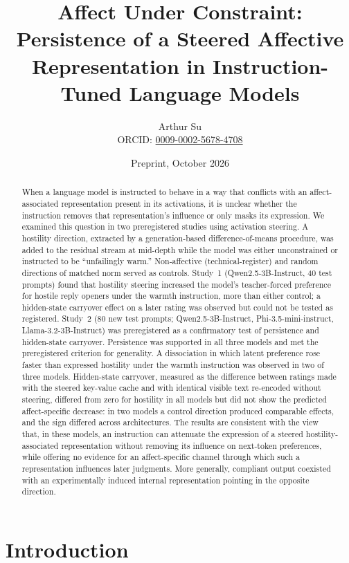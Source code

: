 \documentclass[11pt]{article}
\title{\Large\bfseries Affect Under Constraint: Persistence of a Steered Affective Representation in Instruction-Tuned Language Models}
\author{Arthur Su\\[2pt]
\small ORCID: \href{https://orcid.org/0009-0002-5678-4708}{0009-0002-5678-4708}}
\date{\small Preprint, October 2026}
\begin{document}
\maketitle

\begin{abstract}
\noindent When a language model is instructed to behave in a way that conflicts with an affect-associated representation present in its activations, it is unclear whether the instruction removes that representation's influence or only masks its expression. We examined this question in two preregistered studies using activation steering. A hostility direction, extracted by a generation-based difference-of-means procedure, was added to the residual stream at mid-depth while the model was either unconstrained or instructed to be ``unfailingly warm.'' Non-affective (technical-register) and random directions of matched norm served as controls. Study~1 (Qwen2.5-3B-Instruct, 40 test prompts) found that hostility steering increased the model's teacher-forced preference for hostile reply openers under the warmth instruction, more than either control; a hidden-state carryover effect on a later rating was observed but could not be tested as registered. Study~2 (80 new test prompts; Qwen2.5-3B-Instruct, Phi-3.5-mini-instruct, Llama-3.2-3B-Instruct) was preregistered as a confirmatory test of persistence and hidden-state carryover. Persistence was supported in all three models and met the preregistered criterion for generality. A dissociation in which latent preference rose faster than expressed hostility under the warmth instruction was observed in two of three models. Hidden-state carryover, measured as the difference between ratings made with the steered key-value cache and with identical visible text re-encoded without steering, differed from zero for hostility in all models but did not show the predicted affect-specific decrease: in two models a control direction produced comparable effects, and the sign differed across architectures. The results are consistent with the view that, in these models, an instruction can attenuate the expression of a steered hostility-associated representation without removing its influence on next-token preferences, while offering no evidence for an affect-specific channel through which such a representation influences later judgments. More generally, compliant output coexisted with an experimentally induced internal representation pointing in the opposite direction.
\end{abstract}

\section{Introduction}
\end{document}
